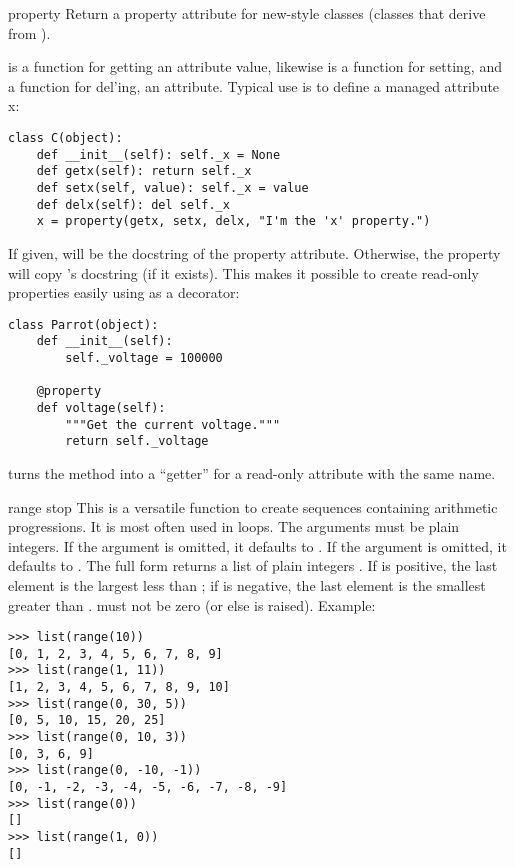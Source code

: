 \begin{funcdesc}{property}{}
  Return a property attribute for new-style classes (classes that
  derive from ).

   is a function for getting an attribute value, likewise
   is a function for setting, and  a function
  for del'ing, an attribute.  Typical use is to define a managed attribute x:

\begin{verbatim}
class C(object):
    def __init__(self): self._x = None
    def getx(self): return self._x
    def setx(self, value): self._x = value
    def delx(self): del self._x
    x = property(getx, setx, delx, "I'm the 'x' property.")
\end{verbatim}

  If given,  will be the docstring of the property attribute.
  Otherwise, the property will copy 's docstring (if it
  exists).  This makes it possible to create read-only properties
  easily using  as a decorator:

\begin{verbatim}
class Parrot(object):
    def __init__(self):
        self._voltage = 100000

    @property
    def voltage(self):
        """Get the current voltage."""
        return self._voltage
\end{verbatim}

  turns the  method into a ``getter'' for a read-only
  attribute with the same name.

\end{funcdesc}

\begin{funcdesc}{range}{ stop}
  This is a versatile function to create sequences containing arithmetic
  progressions.  It is most often used in  loops.  The
  arguments must be plain integers.  If the  argument is
  omitted, it defaults to .  If the  argument is
  omitted, it defaults to .  The full form returns a list of
  plain integers .  If  is positive,
  the last element is the largest  less than ; if  is negative, the last
  element is the smallest 
  greater than .   must not be zero (or else
   is raised).  Example:

\begin{verbatim}
>>> list(range(10))
[0, 1, 2, 3, 4, 5, 6, 7, 8, 9]
>>> list(range(1, 11))
[1, 2, 3, 4, 5, 6, 7, 8, 9, 10]
>>> list(range(0, 30, 5))
[0, 5, 10, 15, 20, 25]
>>> list(range(0, 10, 3))
[0, 3, 6, 9]
>>> list(range(0, -10, -1))
[0, -1, -2, -3, -4, -5, -6, -7, -8, -9]
>>> list(range(0))
[]
>>> list(range(1, 0))
[]
\end{verbatim}
\end{funcdesc}

